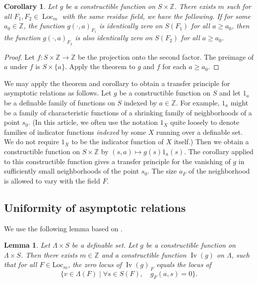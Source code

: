 \documentclass[12pt]{amsart}
\newcommand{\op}[1]{\operatorname{#1}}
\newcommand{\ring}[1]{{\mathbb #1}}
\newcommand{\locus}[1]{\op{Iv}(#1)}
\newcommand{\Loc}{\mathrm{Loc}}
\theoremstyle{plain}
\newtheorem{lem}[thm]{Lemma}
\newtheorem{cor}[thm]{Corollary}
\theoremstyle{definition}
\begin{document}
\begin{cor}\label{cor:12} 
  Let $g$ be a constructible function on $S\times\ring{Z}$.  There
  exists $m$ such for all $F_1,F_2\in\op{Loc}_m$ with the same residue
  field, we have the following.  If for some $a_0\in\ring{Z}$, the
  function $g(\cdot,a)_{F_1}$ is identically zero on $S(F_1)$ for all
  $a\ge a_0$, then the function $g(\cdot,a)_{F_2}$ is also identically
  zero on $S(F_2)$ for all $a\ge a_0$.
\end{cor}

\begin{proof} Let $f:S\times \ring{Z}\to\ring{Z}$ be the projection
  onto the second factor.  The preimage of $a$ under $f$ is
  $S\times\{a\}$.  Apply the theorem to $g$ and $f$ for each $a\ge
  a_0$.
\end{proof}

We may apply the theorem and corollary to obtain a transfer principle
for asymptotic relations as follows.  Let $g$ be a constructible
function on $S$ and let $1_a$ be a definable family of functions on
$S$ indexed by $a\in\ring{Z}$.  For example, $1_a$ might be a family
of characteristic functions of a shrinking family of neighborhoods of
a point $s_0$.  (In this article, we often use the notation $1_X$
quite loosely to denote families of indicator functions {\it indexed}
by some $X$ running over a definable set. We do not require $1_X$ to
be the indicator function of $X$ itself.)  Then we obtain a
constructible function on $S\times\ring{Z}$ by $(s,a)\mapsto
g(s)1_a(s)$.  The corollary applied to this constructible function
gives a transfer principle for the vanishing of $g$ in sufficiently
small neighborhoods of the point $s_0$.  The size $a_F$ of the
neighborhood is allowed to vary with the field $F$.

\subsection{Uniformity of asymptotic relations}

We use the following lemma based on \cite[Th 4.4.4]{CGH}.

\begin{lem}  
  Let $\Lambda\times S$ be a definable set.  Let $g$ be a
  constructible function on $\Lambda\times S$.  Then there exists
  $m\in\ring{Z}$ and a constructible function $\locus{g}$ on $\Lambda$,
  such that for all $F\in\Loc_m$, the zero locus of $\locus{g}_{\,F}$
  equals the locus of
\[
\{v\in \Lambda(F)\mid \forall s\in S(F),\quad g_F(a,s)=0\}.
\]
\end{lem}
\end{document}
